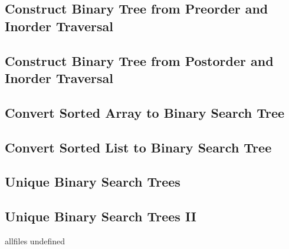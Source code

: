 \documentclass{article}
\begin{document}
\begin{CJK}{UTF8}{gbsn}     %

\else
    
\subsection{Construct Binary Tree from Preorder and Inorder Traversal}

\subsection{Construct Binary Tree from Postorder and Inorder Traversal}

\subsection{Convert Sorted Array to Binary Search Tree}

\subsection{Convert Sorted List to Binary Search Tree}

\subsection{Unique Binary Search Trees}

\subsection{Unique Binary Search Trees II}


\fi

\ifx allfiles undefined
\end{CJK}
\end{document}
